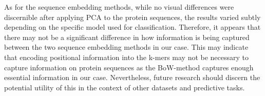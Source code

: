 As for the sequence embedding methods, while no visual differences were discernible after applying PCA to the protein sequences, the results varied subtly depending on the specific model used for classification. Therefore, it appears that there may not be a significant difference in how information is being captured between the two sequence embedding methods in our case. This may indicate that encoding positional information into the k-mers may not be necessary to capture information on protein sequences as the BoW-method captures enough essential information in our case. Nevertheless, future research should discern the potential utility of this in the context of other datasets and predictive tasks.